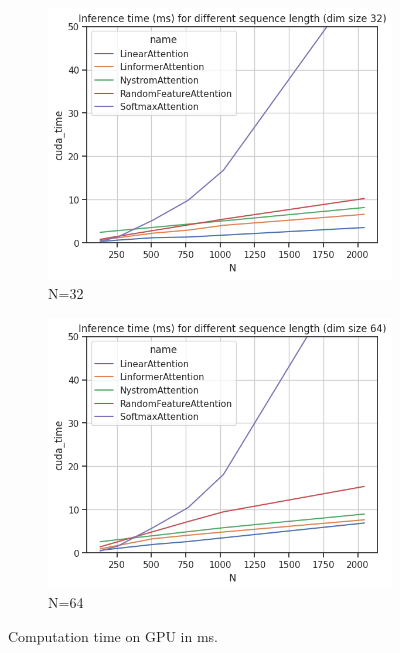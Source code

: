 \begin{figure}[!h]
	\centering
	\begin{subfigure}[t]{0.5\textwidth}
		\centering
		\includegraphics[scale=0.5]{speed_cuda_32.png}
		\caption{N=32} \label{comutation-time-32}
	\end{subfigure}\hfill
	\centering
	\begin{subfigure}[t]{0.5\textwidth}
		\centering
		\includegraphics[scale=0.5]{speed_cuda_64.png}
		\caption{N=64} \label{comutation-time-64}
	\end{subfigure}\hfill

	\caption{Computation time on GPU in ms.}
	\label{fig:comutation-time}
\end{figure}


